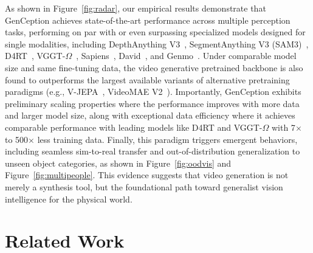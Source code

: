 \documentclass[11pt, a4paper, logo, onecolumn]{googledeepmind}
\newcommand{\ModelName}{GenCeption\xspace}
\begin{document}
As shown in Figure~\ref{fig:radar}, our empirical results demonstrate that \ModelName achieves state-of-the-art performance across multiple perception tasks, performing on par with or even surpassing specialized models designed for single modalities, including DepthAnything V3~\cite{lin2025depth}, SegmentAnything V3 (SAM3)~\cite{carion2025sam}, D4RT~\cite{zhang2025efficiently}, VGGT-$\Omega$~\cite{wang2026vggt}, Sapiens~\cite{sapienseccv2024}, David~\cite{saleh2025david}, and Genmo~\cite{genmo2025}. 
Under comparable model size and same fine-tuning data, the video generative pretrained backbone is also found to outperforms the largest available variants of alternative pretraining paradigms (e.g., V-JEPA~\cite{bardes2024revisiting}, VideoMAE V2~\cite{tong2022videomae}).
Importantly, \ModelName exhibits preliminary scaling properties where the performance improves with more data and larger model size, along with exceptional data efficiency where it achieves comparable performance with leading models like D4RT and VGGT-$\Omega$ with 7$\times$ to 500$\times$ less training data.
Finally, this paradigm triggers emergent behaviors, including seamless sim-to-real transfer and out-of-distribution generalization to unseen object categories, as shown in Figure~\ref{fig:oodvis} and Figure~\ref{fig:multipeople}.
This evidence suggests that video generation is not merely a synthesis tool, but the foundational path toward generalist vision intelligence for the physical world.






\section{Related Work}
\end{document}
